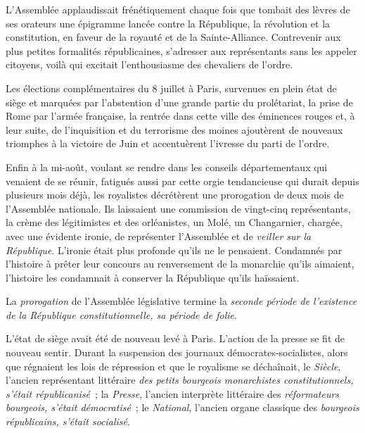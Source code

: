 \documentclass[twoside]{book} %
\begin{document}
L’Assemblée applaudissait frénétiquement chaque fois que tombait des lèvres de ses orateurs une épigramme lancée contre la République, la révolution et la constitution, en faveur de la royauté et de la Sainte-Alliance. Contrevenir aux plus petites formalités républicaines, s’adresser aux représentants sans les appeler citoyens, voilà qui excitait l’enthousiasme des chevaliers de l’ordre.\par
Les élections complémentaires du 8 juillet à Paris, survenues en plein état de siège et marquées par l’abstention d’une grande partie du prolétariat, la prise de Rome par l’armée française, la rentrée dans cette ville des éminences rouges et, à leur suite, de l’inquisition et du terrorisme des moines ajoutèrent de nouveaux triomphes à la victoire de Juin et accentuèrent l’ivresse du parti de l’ordre.\par
Enfin à la mi-août, voulant se rendre dans les conseils départementaux qui venaient de se réunir, fatigués aussi par cette orgie tendancieuse qui durait depuis plusieurs mois déjà, les royalistes décrétèrent une prorogation de deux mois de l’Assemblée nationale. Ils laissaient une commission de vingt-cinq représentants, la crème des légitimistes et des orléanistes, un Molé, un Changarnier, chargée, avec une évidente ironie, de représenter l’Assemblée et de \emph{veiller sur la République}. L’ironie était plus profonde qu’ils ne le pensaient. Condamnés par l’histoire à prêter leur concours au renversement de la monarchie qu’ils aimaient, l’histoire les condamnait à conserver la République qu’ils haïssaient.\par
La \emph{prorogation} de l’Assemblée législative termine la \emph{seconde période de l’existence de la République constitutionnelle, sa période de folie}.\par
L’état de siège avait été de nouveau levé à Paris. L’action de la presse se fit de nouveau sentir. Durant la suspension des journaux démocrates-socialistes, alors que régnaient les lois de répression et que le royalisme se déchaînait, le \emph{Siècle}, l’ancien représentant littéraire \emph{des petits bourgeois monarchistes constitutionnels, s’était républicanisé} ; la \emph{Presse}, l’ancien interprète littéraire des \emph{réformateurs bourgeois, s’était démocratisé} ; le \emph{National}, l’ancien organe classique des \emph{bourgeois républicains, s’était socialisé}.\par
\end{document}
